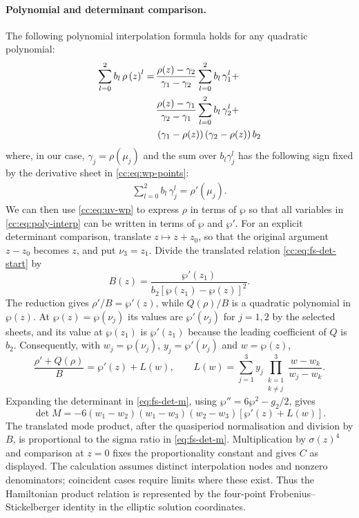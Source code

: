 \documentclass[11pt,a4paper]{article}
\begin{document}
\paragraph{Polynomial and determinant comparison.}
The following polynomial interpolation formula holds for any quadratic polynomial:
\begin{align}
\sum_{l=0}^{2}b_l\,\rho\left(z\right)^l =\, &\frac{\rho{\left(z \right)} - {\gamma}_{2}}{{\gamma}_{1} - {\gamma}_{2}} \sum\limits_{l=0}^{2}b_l\,\gamma_1^l + \notag \\
&\frac{\rho{\left(z \right)} - {\gamma}_{1}}{{\gamma}_{2} - {\gamma}_{1}} \sum\limits_{l=0}^{2}b_l\,\gamma_2^l + \notag \\
&\left({\gamma}_{1} - \rho{\left(z \right)}\right) \left({\gamma}_{2} - \rho{\left(z \right)}\right) b_2 \label{cc:eq:poly-interp}
\end{align}
where, in our case, $\gamma_j=\rho(\mu_j)$ and the sum over $b_l \gamma_j^l$ has the following sign fixed by the derivative sheet in \eqref{cc:eq:wp-points}:
\begin{align}
\sum\limits_{l=0}^{2}b_l\,\gamma_j^l = \rho'\left(\mu_j\right).
\end{align}
We can then use \eqref{cc:eq:uv-wp} to express $\rho$ in terms of $\wp$ so that all variables in \eqref{cc:eq:poly-interp} can be written in terms of $\wp$ and $\wp'$. 
For an explicit determinant comparison, translate $z\mapsto z+z_0$, so that the original argument $z-z_0$ becomes $z$, and put $\nu_3=z_1$.
Divide the translated relation \eqref{cc:eq:fs-det-start} by
\begin{equation}
B(z)=\frac{\wp'(z_1)}{b_2[\wp(z_1)-\wp(z)]^2}.
\end{equation}
The reduction gives $\rho'/B=\wp'(z)$, while $Q(\rho)/B$ is a quadratic polynomial in $\wp(z)$.
At $\wp(z)=\wp(\nu_j)$ its values are $\wp'(\nu_j)$ for $j=1,2$ by the selected sheets, and its value at $\wp(z_1)$ is $\wp'(z_1)$ because the leading coefficient of $Q$ is $b_2$.
Consequently, with $w_j=\wp(\nu_j)$, $y_j=\wp'(\nu_j)$ and $w=\wp(z)$,
\begin{equation}
\frac{\rho'+Q(\rho)}{B}=\wp'(z)+L(w),\qquad
L(w)=\sum_{j=1}^3 y_j\prod_{\substack{k=1\\k\ne j}}^3\frac{w-w_k}{w_j-w_k}.
\end{equation}
Expanding the determinant in \eqref{eq:fs-det-m}, using $\wp''=6\wp^2-g_2/2$, gives
\begin{equation}
\det M=-6(w_1-w_2)(w_1-w_3)(w_2-w_3)[\wp'(z)+L(w)].
\end{equation}
The translated mode product, after the quasiperiod normalisation and division by $B$, is proportional to the sigma ratio in \eqref{eq:fs-det-m}.
Multiplication by $\sigma(z)^4$ and comparison at $z=0$ fixes the proportionality constant and gives $C$ as displayed.
The calculation assumes distinct interpolation nodes and nonzero denominators; coincident cases require limits where these exist.
Thus the Hamiltonian product relation is represented by the four-point Frobenius--Stickelberger identity in the elliptic solution coordinates.
\end{document}
